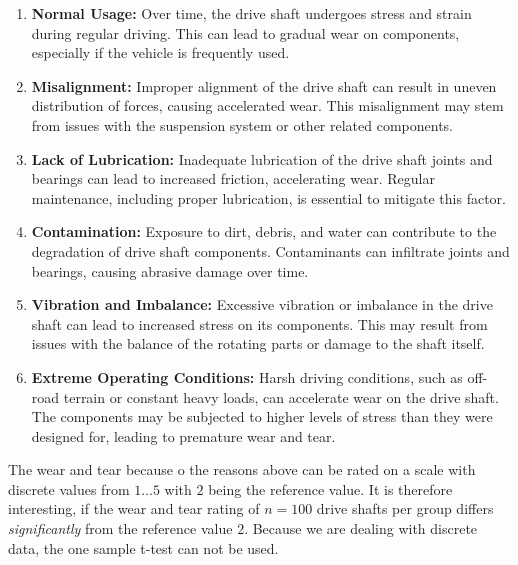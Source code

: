 \documentclass[
  a4paper,
]{scrbook}
\begin{document}
\begin{enumerate}
\def\labelenumi{\arabic{enumi}.}
\item
  \textbf{Normal Usage:} Over time, the drive shaft undergoes stress and
  strain during regular driving. This can lead to gradual wear on
  components, especially if the vehicle is frequently used.
\item
  \textbf{Misalignment:} Improper alignment of the drive shaft can
  result in uneven distribution of forces, causing accelerated wear.
  This misalignment may stem from issues with the suspension system or
  other related components.
\item
  \textbf{Lack of Lubrication:} Inadequate lubrication of the drive
  shaft joints and bearings can lead to increased friction, accelerating
  wear. Regular maintenance, including proper lubrication, is essential
  to mitigate this factor.
\item
  \textbf{Contamination:} Exposure to dirt, debris, and water can
  contribute to the degradation of drive shaft components. Contaminants
  can infiltrate joints and bearings, causing abrasive damage over time.
\item
  \textbf{Vibration and Imbalance:} Excessive vibration or imbalance in
  the drive shaft can lead to increased stress on its components. This
  may result from issues with the balance of the rotating parts or
  damage to the shaft itself.
\item
  \textbf{Extreme Operating Conditions:} Harsh driving conditions, such
  as off-road terrain or constant heavy loads, can accelerate wear on
  the drive shaft. The components may be subjected to higher levels of
  stress than they were designed for, leading to premature wear and
  tear.
\end{enumerate}

The wear and tear because o the reasons above can be rated on a scale
with discrete values from \(1 \ldots 5\) with \(2\) being the reference
value. It is therefore interesting, if the wear and tear rating of
\(n=100\) drive shafts per group differs \emph{significantly} from the
reference value \(2\). Because we are dealing with discrete data, the
one sample t-test can not be used.
\end{document}
